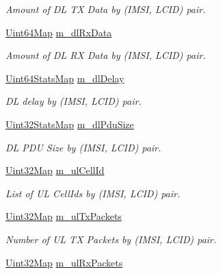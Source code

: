 \begin{DoxyCompactItemize}
\begin{DoxyCompactList}\small\item\em Amount of DL TX Data by (I\+M\+SI, L\+C\+ID) pair. \end{DoxyCompactList}\item 
\hyperlink{namespacens3_a02246d7bb546e26a989e837a36d17797}{Uint64\+Map} \hyperlink{classns3_1_1MmWaveBearerStatsCalculator_a247ac6ba79c22677428a2bc174956409}{m\+\_\+dl\+Rx\+Data}
\begin{DoxyCompactList}\small\item\em Amount of DL RX Data by (I\+M\+SI, L\+C\+ID) pair. \end{DoxyCompactList}\item 
\hyperlink{namespacens3_a302499faee8d6f35953a73b52b34c421}{Uint64\+Stats\+Map} \hyperlink{classns3_1_1MmWaveBearerStatsCalculator_ae3afce5a35c236aa77d40d9ced85eb76}{m\+\_\+dl\+Delay}
\begin{DoxyCompactList}\small\item\em DL delay by (I\+M\+SI, L\+C\+ID) pair. \end{DoxyCompactList}\item 
\hyperlink{namespacens3_a024aec20f35b29a93b5bfcaacf8ce269}{Uint32\+Stats\+Map} \hyperlink{classns3_1_1MmWaveBearerStatsCalculator_a50c7216eb7c90030b8563d7f85f90991}{m\+\_\+dl\+Pdu\+Size}
\begin{DoxyCompactList}\small\item\em DL P\+DU Size by (I\+M\+SI, L\+C\+ID) pair. \end{DoxyCompactList}\item 
\hyperlink{namespacens3_abfd8d9eba8902c110c885a991a0529cd}{Uint32\+Map} \hyperlink{classns3_1_1MmWaveBearerStatsCalculator_a734da84e20a1521ee35a28692534ed9c}{m\+\_\+ul\+Cell\+Id}
\begin{DoxyCompactList}\small\item\em List of UL Cell\+Ids by (I\+M\+SI, L\+C\+ID) pair. \end{DoxyCompactList}\item 
\hyperlink{namespacens3_abfd8d9eba8902c110c885a991a0529cd}{Uint32\+Map} \hyperlink{classns3_1_1MmWaveBearerStatsCalculator_a71ec089c616f65f0fba9bb10ca6c1d66}{m\+\_\+ul\+Tx\+Packets}
\begin{DoxyCompactList}\small\item\em Number of UL TX Packets by (I\+M\+SI, L\+C\+ID) pair. \end{DoxyCompactList}\item 
\hyperlink{namespacens3_abfd8d9eba8902c110c885a991a0529cd}{Uint32\+Map} \hyperlink{classns3_1_1MmWaveBearerStatsCalculator_a66a290c7b52e209c9e505690f8a679bd}{m\+\_\+ul\+Rx\+Packets}

\end{DoxyCompactItemize}

